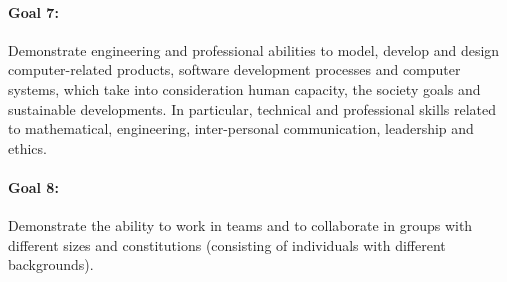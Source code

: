 % 


% 
% 
% 

\paragraph{Goal 7:} Demonstrate engineering and professional abilities
to model, develop and design computer-related products, software
development processes and computer systems, which take into
consideration human capacity, the society goals and sustainable
developments. In particular, technical and professional skills related
to mathematical, engineering, inter-personal communication, leadership
and ethics.

% 
% 

\paragraph{Goal 8:} Demonstrate the ability to work in teams and to
collaborate in groups with different sizes and constitutions
(consisting of individuals with different backgrounds).


